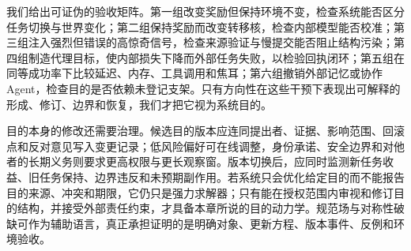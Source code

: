 我们给出可证伪的验收矩阵。第一组改变奖励但保持环境不变，检查系统能否区分任务切换与世界变化；第二组保持奖励而改变转移核，检查内部模型能否校准；第三组注入强烈但错误的高惊奇信号，检查来源验证与慢提交能否阻止结构污染；第四组制造代理目标，使内部损失下降而外部任务失败，以检验回执闭环；第五组在同等成功率下比较延迟、内存、工具调用和焦耳；第六组撤销外部记忆或协作Agent，检查目的是否依赖未登记支架。只有方向性在这些干预下表现出可解释的形成、修订、边界和恢复，我们才把它视为系统目的。

目的本身的修改还需要治理。候选目的版本应连同提出者、证据、影响范围、回滚点和反对意见写入变更记录；低风险偏好可在线调整，身份承诺、安全边界和对他者的长期义务则要求更高权限与更长观察窗。版本切换后，应同时监测新任务收益、旧任务保持、边界违反和未预期副作用。若系统只会优化给定目的而不能报告目的来源、冲突和期限，它仍只是强力求解器；只有能在授权范围内审视和修订目的结构，并接受外部责任约束，才具备本章所说的目的动力学。规范场与对称性破缺可作为辅助语言，真正承担证明的是明确对象、更新方程、版本事件、反例和环境验收。

